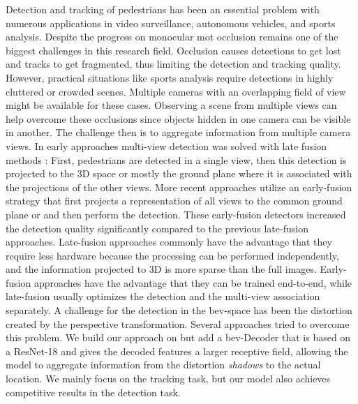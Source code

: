 \documentclass[10pt,twocolumn,letterpaper]{article}
\begin{document}
Detection and tracking of pedestrians has been an essential problem with numerous applications in video surveillance, autonomous vehicles, and sports analysis. Despite the progress on monocular \gls{mot} occlusion remains one of the biggest challenges in this research field. Occlusion causes detections to get lost and tracks to get fragmented, thus limiting the detection and tracking quality. However, practical situations like sports analysis require detections in highly cluttered or crowded scenes. Multiple cameras with an overlapping field of view might be available for these cases. Observing a scene from multiple views can help overcome these occlusions since objects hidden in one camera can be visible in another. The challenge then is to aggregate information from multiple camera views. 
In early approaches multi-view detection was solved with late fusion methods \cite{xu2016multi}: First, pedestrians are detected in a single view, then this detection is projected to the 3D space or mostly the ground plane where it is associated with the projections of the other views. More recent approaches \cite{hou2020multiview, hou2021multiview} utilize an early-fusion strategy that first projects a representation of all views to the common ground plane or \textit{} and then perform the detection. These early-fusion detectors \cite{hou2020multiview, hou2021multiview} increased the detection quality significantly compared to the previous late-fusion approaches. Late-fusion approaches commonly have the advantage that they require less hardware because the processing can be performed independently, and the information projected to 3D is more sparse than the full images. Early-fusion approaches have the advantage that they can be trained end-to-end, while late-fusion usually optimizes the detection and the multi-view association separately.
A challenge for the detection in the \gls{bev}-space has been the distortion created by the perspective transformation. Several approaches\cite{hou2021multiview, lee2023multi, song2021stacked} tried to overcome this problem. We build our approach on \cite{hou2020multiview} but add a \gls{bev}-Decoder that is based on a ResNet-18 and gives the decoded features a larger receptive field, allowing the model to aggregate information from the distortion \textit{shadows} to the actual location. We mainly focus on the tracking task, but our model also achieves competitive results in the detection task.
\end{document}

